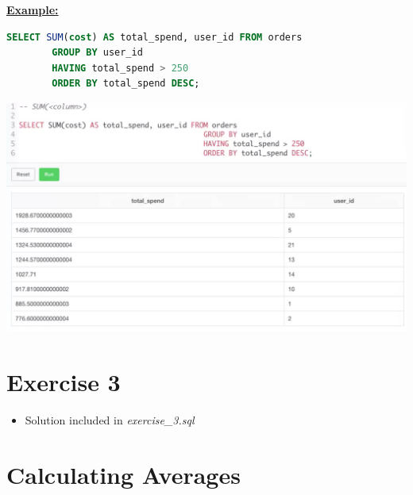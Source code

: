 \documentclass[12pt]{article}
\begin{document}
\begin{itemize}
\begin{itemize}
        \bigskip

        \underline{\textbf{Example:}}

        \bigskip


    \begin{lstlisting}[language=SQL]
    SELECT SUM(cost) AS total_spend, user_id FROM orders
        GROUP BY user_id
        HAVING total_spend > 250
        ORDER BY total_spend DESC;
    \end{lstlisting}

        \bigskip

        \begin{center}
        \includegraphics[width=\linewidth]{images/part_3_notes_3.png}
        \end{center}

    \end{itemize}
\end{itemize}

\bigskip

\section{Exercise 3}

\bigskip

\begin{itemize}
    \item Solution included in \textit{exercise\_3.sql}
\end{itemize}

\bigskip

\section{Calculating Averages}

\bigskip
\end{document}
